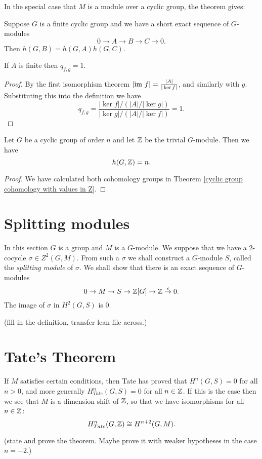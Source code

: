 In the special case that $M$ is a module over a cyclic group, the theorem gives:

\begin{corollary}
  Suppose $G$ is a finite cyclic group and we have a short exact sequence of $G$-modules
  \[
    0 \to A \to B \to C \to 0.
  \]
  Then $h(G,B) = h(G,A) h(G,C)$.
\end{corollary}

\begin{theorem}
  \label{Herbrand of finite}
  If $A$ is finite then $q_{f,g} = 1$.
\end{theorem}

\begin{proof}
  By the first isomorphism theorem $|\mathrm{im}\  f| = \frac{|A|}{|\ker f|}$, and similarly with $g$.
  Substituting this into the definition we have
  \[
    q_{f,g} = \frac{|\ker f| / (|A| / |\ker g|)}{|\ker g| / (|A| / |\ker f|)}
    = 1.
  \]
\end{proof}

\begin{lemma}
  Let $G$ be a cyclic group of order $n$ and let ${\mathbb Z}$ be the trivial $G$-module.
  Then we have
  \[
    h(G,{\mathbb Z}) = n.
  \]
\end{lemma}

\begin{proof}
  We have calculated both cohomology groups in
  Theorem \ref{cyclic group cohomology with values in Z}.
\end{proof}


\section{Splitting modules}

In this section $G$ is a group and $M$ is a $G$-module.
We suppose that we have a 2-cocycle $\sigma \in Z^2(G,M)$.
From such a $\sigma$ we shall construct a $G$-module $S$, called the \emph{splitting module} of
$\sigma$.
We shall show that there is an exact sequence of $G$-modules
\[
  0 \to M \to S \to {\mathbb Z}[G] \to {\mathbb Z} \stackrel{\epsilon}\to 0.
\]
The image of $\sigma$ in $H^2(G,S)$ is $0$.

(fill in the definition, transfer lean file across.)


\section{Tate's Theorem}

If $M$ satisfies certain conditions, then Tate has proved that $H^n(G,S)=0$ for all $n>0$,
and more generally $H^n_{Tate}(G,S)=0$ for all $n \in {\mathbb Z}$.
If this is the case then we see that $M$ is a dimension-shift of ${\mathbb Z}$, so that we have
isomorphisms for all $n \in {\mathbb Z}$:
\[
  H^n_{Tate}(G,{\mathbb Z}) \cong H^{n+2}(G,M).
\]

(state and prove the theorem. Maybe prove it with weaker hypotheses in the case $n=-2$.)
